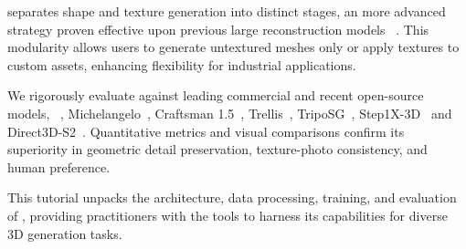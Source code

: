 \emph{\methodName} separates shape and texture generation into distinct stages, an more advanced strategy proven effective upon previous large reconstruction models ~\cite{hong2023lrm,yang2024hunyuan3d,xu2024instantmesh,yang2024viewfusion,weng2023consistent123,liu2023syncdreamer,shi2023zero123++,liu2023zero}. This modularity allows users to generate untextured meshes only or apply textures to custom assets, enhancing flexibility for industrial applications.  

We rigorously evaluate \emph{\methodName} against leading commercial and recent open-source models, ~\eg, Michelangelo~\cite{zhao2023michelangelo}, Craftsman 1.5~\cite{li2024craftsman}, Trellis~\cite{xiang2024structured}, TripoSG~\cite{li2025triposg}, Step1X-3D~\cite{li2025step1x} and Direct3D-S2~\cite{wu2025direct3ds2gigascale3dgeneration}. Quantitative metrics and visual comparisons confirm its superiority in geometric detail preservation, texture-photo consistency, and human preference.  

This tutorial unpacks the architecture, data processing, training, and evaluation of \emph{\methodName}, providing practitioners with the tools to harness its capabilities for diverse 3D generation tasks.  
